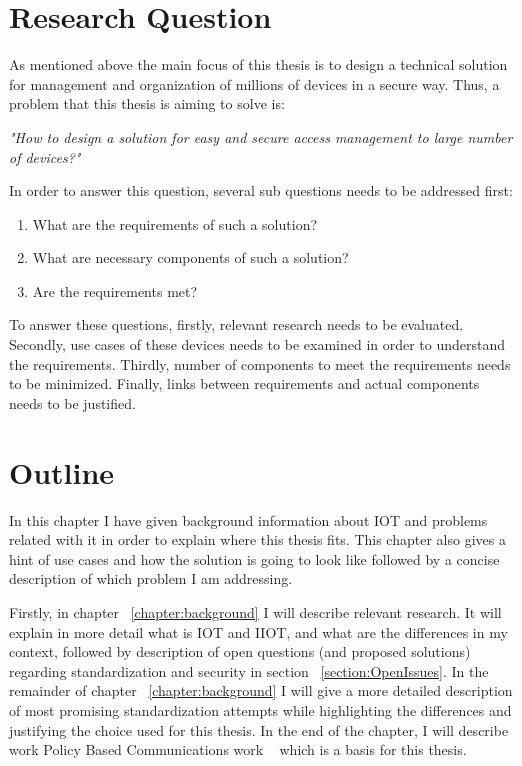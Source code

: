 \section{Research Question}

As mentioned above the main focus of this thesis is to design a technical solution for management and organization of millions of devices in a secure way. Thus, a problem that this thesis is aiming to solve is:

\begin{center}
\emph{"How to design a solution for easy and secure access management to large number of devices?"}
\end{center}

In order to answer this question, several sub questions needs to be addressed first:

\begin{enumerate}
	\setlength{\itemsep}{1pt}
	\item What are the requirements of such a solution?
	\item What are necessary components of such a solution?
	\item Are the requirements met?
\end{enumerate}

To answer these questions, firstly, relevant research needs to be evaluated. Secondly, use cases of these devices needs to be examined in order to understand the requirements. Thirdly, number of components to meet the requirements needs to be minimized. Finally, links between requirements and actual components needs to be justified.

\section{Outline}

In this chapter I have given background information about IOT and problems related with it in order to explain where this thesis fits. This chapter also gives a hint of use cases and how the solution is going to look like followed by a concise description of which problem I am addressing.

Firstly, in chapter ~\ref{chapter:background} I will describe relevant research. It will explain in more detail what is IOT and IIOT, and what are the differences in my context, followed by description of open questions (and proposed solutions) regarding standardization and security in section ~\ref{section:OpenIssues}. In the remainder of chapter ~\ref{chapter:background} I will give a more detailed description of most promising standardization attempts while highlighting the differences and justifying the choice used for this thesis. In the end of the chapter, I will describe work Policy Based Communications work ~\cite{Kantola} which is a basis for this thesis.

